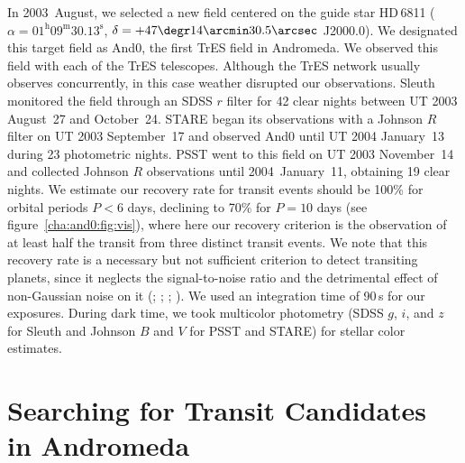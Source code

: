 In 2003~August, we selected a new field centered on the guide star \mbox{HD\,6811} ($\alpha = 01^{\mathrm h} 09^{\mathrm m} 30.13^{\mathrm s}$, $\delta = +47\degr 14\arcmin 30.5\arcsec$ J2000.0).
We designated this target field as And0, the first TrES field in Andromeda.
We observed this field with each of the TrES telescopes.
Although the TrES network usually observes concurrently, in this case weather disrupted our observations.
Sleuth monitored the field through an SDSS $r$ filter for 42 clear nights between UT 2003 August~27 and October~24.
STARE began its observations with a Johnson $R$ filter on UT 2003 September~17 and observed And0 until UT 2004 January~13 during 23 photometric nights.
PSST went to this field on UT 2003 November~14 and collected Johnson $R$ observations until 2004~January~11, obtaining 19 clear nights.
We estimate our recovery rate for transit events should be 100\% for orbital periods $P<6$ days, declining to 70\% for $P=10$ days (see figure~\ref{cha:and0:fig:vis}), where here our recovery criterion is the observation of at least half the transit from three distinct transit events.
We note that this recovery rate is a necessary but not sufficient criterion to detect transiting planets,
since it neglects the signal-to-noise ratio and the detrimental effect of non-Gaussian noise on it
(\citealp*[see, e.g.,][]{Gaudi_Seager_Mallen-Ornelas:apj:2005a}; \citealp{Gaudi:apjl:2005a}; \citealp*{Pont_Zucker_Queloz:mnras:2006a}; \citealp{Smith_Collier-Cameron_Christian:mnras:2006a, Gaudi_Winn:apj:2007a}).%
We used an integration time of 90\,s for our exposures.
During dark time, we took multicolor photometry (SDSS $g$, $i$, and $z$ for Sleuth and Johnson $B$ and $V$ for PSST and STARE) for stellar color estimates.

\section[Searching for Transit Candidates in Andromeda]{Searching for Transit Candidates \\ in Andromeda}\label{cha:and0:sec:search}

